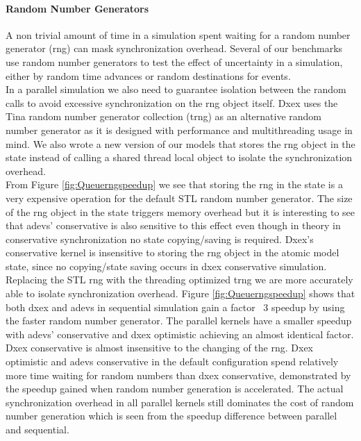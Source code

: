 \paragraph*{Random Number Generators}
A non trivial amount of time in a simulation spent waiting for a random number generator (rng) can mask synchronization overhead. Several of our benchmarks use random number generators to test the effect of uncertainty in a simulation, either by random time advances or random destinations for events. \\
In a parallel simulation we also need to guarantee isolation between the random calls to avoid excessive synchronization on the rng object itself. 
Dxex uses the Tina random number generator collection (trng) \cite{PhysRevE.75.066701} as an alternative random number generator as it is designed with performance and multithreading usage in mind. 
We also wrote a new version of our models that stores the rng object in the state instead of calling a shared thread local object to isolate the synchronization overhead.\\
From Figure \ref{fig:Queuerngspeedup} we see that storing the rng in the state is a very expensive operation for the default STL random number generator. The size of the rng object in the state triggers memory overhead but it is interesting to see that adevs' conservative is also sensitive to this effect even though in theory in conservative synchronization no state copying/saving is required. 
Dxex's conservative kernel is insensitive to storing the rng object in the atomic model state, since no copying/state saving occurs in dxex conservative simulation. \\
Replacing the STL rng with the threading optimized trng we are more accurately able to isolate synchronization overhead. Figure \ref{fig:Queuerngspeedup} shows that both dxex and adevs in sequential simulation gain a factor ~3 speedup by using the faster random number generator. The parallel kernels have a smaller speedup with adevs' conservative and dxex optimistic achieving an almost identical factor. Dxex conservative is almost insensitive to the changing of the rng. 
Dxex optimistic and adevs conservative in the default configuration spend relatively more time waiting for random numbers than dxex conservative, demonstrated by the speedup gained when random number generation is accelerated.
The actual synchronization overhead in all parallel kernels still dominates the cost of random number generation which is seen from the speedup difference between parallel and sequential.\\
